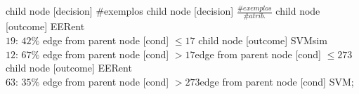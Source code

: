 child {node [decision] {\#exemplos}
child {node [decision] {$\frac{\#exemplos}{\#atrib.}$}
child {node [outcome] {EERent \\$19$: $42\%$} edge from parent node [cond] {$\leq17$}}
child {node [outcome] {SVMsim \\$12$: $67\%$} edge from parent node [cond] {$>17$}}edge from parent node [cond] {$\leq273$}}
child {node [outcome] {EERent \\$63$: $35\%$} edge from parent node [cond] {$>273$}}edge from parent node [cond] {SVM}};